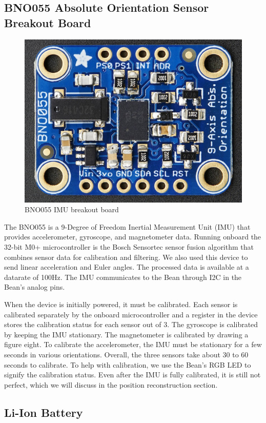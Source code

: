 \documentclass[10pt,journal]{IEEEtran}
\begin{document}
\subsection{BNO055 Absolute Orientation Sensor Breakout Board}

\begin{figure}[H]
  \centering
    \includegraphics[width=0.6\linewidth]{figures/imu}
  \caption{BNO055 IMU breakout board}
  \label{fig:imu}
\end{figure}
  The BNO055 is a 9-Degree of Freedom Inertial Measurement Unit (IMU) that provides accelerometer, gyroscope, and magnetometer data. Running onboard the 32-bit M0+ microcontroller is the Bosch Sensortec sensor fusion algorithm that combines sensor data for calibration and filtering. We also used this device to send linear acceleration and Euler angles. The processed data is available at a datarate of 100Hz. The IMU communicates to the Bean through I2C in the Bean's analog pins.
\par When the device is initially powered, it must be calibrated. Each sensor is calibrated separately by the onboard microcontroller and a register in the device stores the calibration status for each sensor out of 3. The gyroscope is calibrated by keeping the IMU stationary. The magnetometer is calibrated by drawing a figure eight. To calibrate the accelerometer, the IMU must be stationary for a few seconds in various orientations. Overall, the three sensors take about 30 to 60 seconds to calibrate. To help with calibration, we use the Bean's RGB LED to signify the calibration status. Even after the IMU is fully calibrated, it is still not perfect, which we will discuss in the position reconstruction section.
\subsection{Li-Ion Battery}
\end{document}
